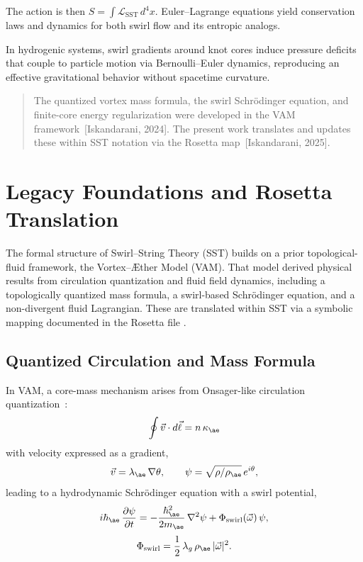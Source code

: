 \documentclass[11pt]{article}
\begin{document}
    The action is then $S = \int \mathcal{L}_{\text{SST}} \, d^4x$. Euler–Lagrange equations yield conservation laws and dynamics for both swirl flow and its entropic analogs.

    In hydrogenic systems, swirl gradients around knot cores induce pressure deficits that couple to particle motion via Bernoulli–Euler dynamics, reproducing an effective gravitational behavior without spacetime curvature.

    \begin{quote}
    The quantized vortex mass formula, the swirl Schrödinger equation, and finite-core energy regularization were developed in the VAM framework~[Iskandarani, 2024]. The present work translates and updates these within SST notation via the Rosetta map~[Iskandarani, 2025]. %
    \end{quote}



\section{Legacy Foundations and Rosetta Translation}
\label{sec:legacy-rosetta}

    The formal structure of Swirl–String Theory (SST) builds on a prior topological-fluid framework, the Vortex–Æther Model (VAM). That model derived physical results from circulation quantization and fluid field dynamics, including a topologically quantized mass formula, a swirl-based Schrödinger equation, and a non-divergent fluid Lagrangian. These are translated within SST via a symbolic mapping documented in the Rosetta file \cite{VAM-15, vamrosetta2025}.

    \subsection{Quantized Circulation and Mass Formula}

        In VAM, a core-mass mechanism arises from Onsager-like circulation quantization~\cite{onsager1949,feynman1955}:
        \begin{equation}
            \oint \vec{v} \cdot d\vec{\ell} = n \, \kappa_{\ae}
        \end{equation}
        with velocity expressed as a gradient,
        \begin{equation}
            \vec{v} = \lambda_{\ae} \, \nabla \theta, \qquad \psi = \sqrt{\rho/\rho_{\ae}}\, e^{i\theta},
        \end{equation}
        leading to a hydrodynamic Schrödinger equation with a swirl potential,
        \begin{equation}
            i\hbar_{\ae} \, \frac{\partial \psi}{\partial t} = -\frac{\hbar_{\ae}^2}{2m_{\ae}} \, \nabla^2 \psi + \Phi_{\text{swirl}}(\vec{\omega})\, \psi,
        \end{equation}
        \begin{equation}
            \Phi_{\text{swirl}} = \frac{1}{2} \, \lambda_g \, \rho_{\ae} \, |\vec{\omega}|^2.
        \end{equation}
\end{document}
